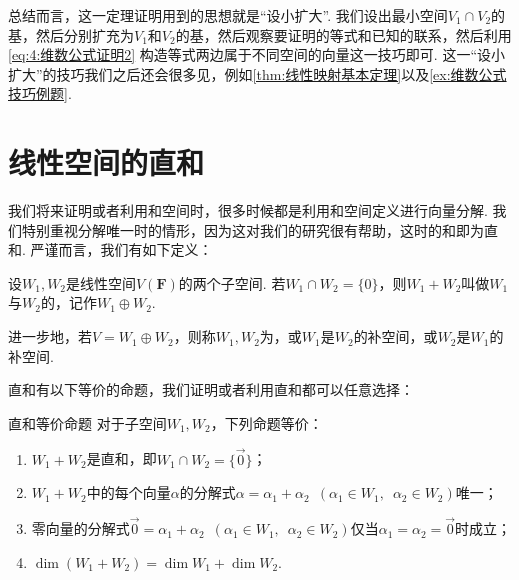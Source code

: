 总结而言，这一定理证明用到的思想就是``设小扩大''. 我们设出最小空间$V_1\cap V_2$的基，然后分别扩充为$V_1$和$V_2$的基，然后观察要证明的等式和已知的联系，然后利用\autoref{eq:4:维数公式证明2} 构造等式两边属于不同空间的向量这一技巧即可. 这一``设小扩大''的技巧我们之后还会很多见，例如\autoref{thm:线性映射基本定理}以及\autoref{ex:维数公式技巧例题}.

\section{线性空间的直和}

我们将来证明或者利用和空间时，很多时候都是利用和空间定义进行向量分解. 我们特别重视分解唯一时的情形，因为这对我们的研究很有帮助，这时的和即为直和. 严谨而言，我们有如下定义：
\begin{definition}{}{}
    设$W_1,W_2$是线性空间$V(\mathbf{F})$的两个子空间. 若$W_1 \cap W_2=\{0\}$，则$W_1+W_2$叫做$W_1$与$W_2$的，记作$W_1\oplus W_2$.

    进一步地，若$V=W_1\oplus W_2$，则称$W_1,W_2$为，或$W_1$是$W_2$的补空间，或$W_2$是$W_1$的补空间.
\end{definition}

直和有以下等价的命题，我们证明或者利用直和都可以任意选择：
\begin{theorem}{}{直和等价命题}
    对于子空间$W_1,W_2$，下列命题等价：
    \begin{enumerate}
        \item $W_1+W_2$是直和，即$W_1 \cap W_2=\{\vec{0}\}$；

        \item $W_1+W_2$中的每个向量$\alpha$的分解式$\alpha=\alpha_1+\alpha_2\enspace(\alpha_1\in W_1,\enspace\alpha_2\in W_2)$唯一；

        \item 零向量的分解式$\vec{0}=\alpha_1+\alpha_2 \enspace(\alpha_1\in W_1,\enspace\alpha_2\in W_2)$仅当$\alpha_1=\alpha_2=\vec{0}$时成立；

        \item $\dim (W_1+W_2)=\dim W_1+\dim W_2$.
    \end{enumerate}
\end{theorem}

